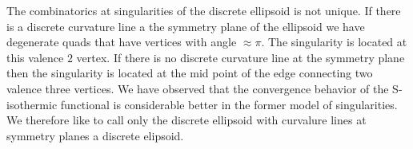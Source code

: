 \documentclass[Thesis.tex]{subfiles}
\begin{document}
The combinatorics at singularities of the discrete ellipsoid is not unique. If there is a discrete 
curvature line a the symmetry plane of the ellipsoid we have degenerate quads that have 
vertices with angle $\approx\pi$. The singularity is located at this valence $2$ vertex. 
If there is no discrete curvature line at the symmetry plane then the singularity is located at the 
mid point of the edge connecting two valence three vertices. We have observed that 
the convergence behavior of the S-isothermic functional is considerable better in the former 
model of singularities. We therefore like to call only the discrete ellipsoid with curvalure 
lines at symmetry planes a discrete elipsoid.

\subfilebibliography
\end{document}
